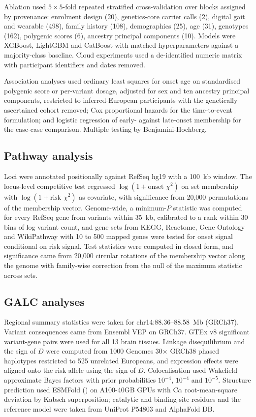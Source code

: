 \documentclass[10pt]{article}
\begin{document}
Ablation used $5\times5$-fold repeated stratified cross-validation over blocks assigned by
provenance: enrolment design (20), genetics-core carrier calls (2), digital gait and wearable
(498), family history (108), demographics (25), age (31), genotypes (162), polygenic scores (6),
ancestry principal components (10). Models were XGBoost, LightGBM and CatBoost with matched
hyperparameters against a majority-class baseline. Cloud experiments used a de-identified numeric
matrix with participant identifiers and dates removed.

Association analyses used ordinary least squares for onset age on standardised polygenic score or
per-variant dosage, adjusted for sex and ten ancestry principal components, restricted to
inferred-European participants with the genetically ascertained cohort removed; Cox proportional
hazards for the time-to-event formulation; and logistic regression of early- against late-onset
membership for the case-case comparison. Multiple testing by Benjamini-Hochberg.

\subsection*{Pathway analysis}

Loci were annotated positionally against RefSeq hg19 with a 100~kb window. The locus-level
competitive test regressed $\log(1 + \text{onset }\chi^2)$ on set membership with
$\log(1 + \text{risk }\chi^2)$ as covariate, with significance from 20,000 permutations of the
membership vector. Genome-wide, a minimum-$P$ statistic was computed for every RefSeq gene from
variants within 35~kb, calibrated to a rank within 30 bins of log variant count, and gene sets
from KEGG, Reactome, Gene Ontology and WikiPathway with 10 to 500 mapped genes were tested for
onset signal conditional on risk signal. Test statistics were computed in closed form, and significance came from 20,000 circular rotations of the membership vector
along the genome with family-wise correction from the null of the maximum statistic across sets.

\subsection*{GALC analyses}

Regional summary statistics were taken for chr14:88.36--88.58~Mb (GRCh37). Variant consequences
came from Ensembl VEP on GRCh37. GTEx v8 significant variant-gene pairs were used for all 13 brain
tissues. Linkage disequilibrium and the sign of $D$ were computed from 1000 Genomes 30$\times$
GRCh38 phased haplotypes restricted to 525 unrelated Europeans, and expression effects were
aligned onto the risk allele using the sign of $D$. Colocalisation used Wakefield approximate
Bayes factors with prior probabilities $10^{-4}$, $10^{-4}$ and $10^{-5}$. Structure prediction
used ESMFold () on A100-40GB GPUs with C$\alpha$ root-mean-square
deviation by Kabsch superposition; catalytic and binding-site residues and the reference model
were taken from UniProt P54803 and AlphaFold DB.
\end{document}
